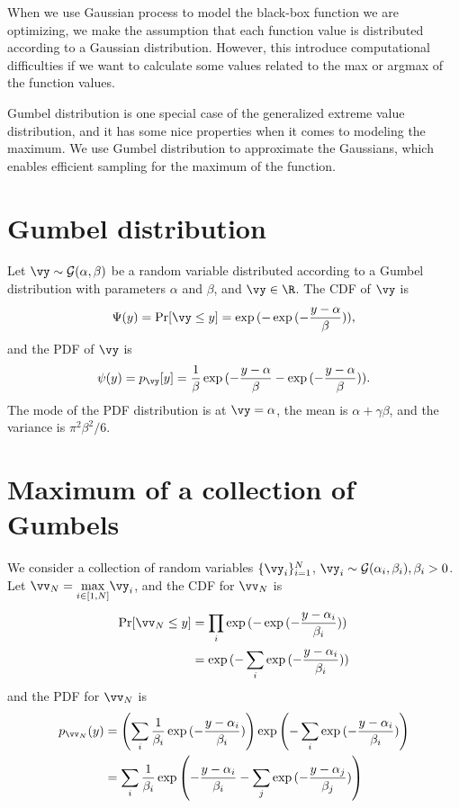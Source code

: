 %
When we use Gaussian process to model the black-box function we are optimizing, we make the assumption that each function value is distributed according to a Gaussian distribution. However, this introduce computational difficulties if we want to calculate some values related to the max or argmax of the function values. 

Gumbel distribution is one special case of the generalized extreme value distribution, and it has some nice properties when it comes to modeling the maximum. We use Gumbel distribution to approximate the Gaussians, which enables efficient sampling for the maximum of the function.%

\section{Gumbel distribution}
Let $\vy\sim \mathcal G(\alpha,\beta)$ be a random variable distributed according to a Gumbel distribution with parameters $\alpha$ and $\beta$, and $\vy\in \R$. The CDF of $\vy$ is 
$$ \Psi(y)=\Pr[\vy\leq y] = \exp{(-\exp{(-\frac{y-\alpha}{\beta})})},$$
and the PDF of $\vy$ is 
$$ \psi(y)=p_{\vy}[y] = \frac{1}{\beta}\exp{(-\frac{y-\alpha}{\beta}-\exp{(-\frac{y-\alpha}{\beta})})}.$$
The mode of the PDF distribution is at $\vy=\alpha$, the mean is $\alpha+\gamma\beta$, and the variance is $\pi^2\beta^2/6$. 


\section{Maximum of a collection of Gumbels}
We consider a collection of random variables $\{\vy_i\}_{i=1}^N$, $\vy_i\sim \mathcal G(\alpha_i,\beta_i), \beta_i>0$. Let $\vv_{N}=\underset{i\in[1,N]}{\max} \vy_i$, and the CDF for $\vv_N$ is
\begin{align}
\Pr[\vv_N\leq y] &=\prod_i \exp{(-\exp{(-\frac{y-\alpha_i}{\beta_i})})}\\
&=\exp{(-\sum_i\exp{(-\frac{y-\alpha_i}{\beta_i})})}
\end{align}
and the PDF for $\vv_N$ is
\begin{align}
p_{\vv_N}(y) &= \left(\sum_i\frac{1}{\beta_i}\exp{(-\frac{y-\alpha_i}{\beta_i})}\right)\exp{\left(-\sum_i\exp{(-\frac{y-\alpha_i}{\beta_i})}\right)}\\
&= \sum_i\frac{1}{\beta_i}\exp{\left(-\frac{y-\alpha_i}{\beta_i} -\sum_j\exp{(-\frac{y-\alpha_j}{\beta_j})}\right)}
\end{align}

